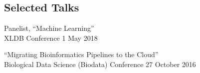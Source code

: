 \documentclass[margin,line]{resume}
\begin{document}
\begin{resume}
\section{\mysidestyle Selected Talks}

    Panelist, ``Machine Learning''\\
    XLDB Conference \hfill 1 May 2018

    ``Migrating Bioinformatics Pipelines to the Cloud''\\
    Biological Data Science (Biodata) Conference \hfill 27 October 2016






\end{resume}
\end{document}
